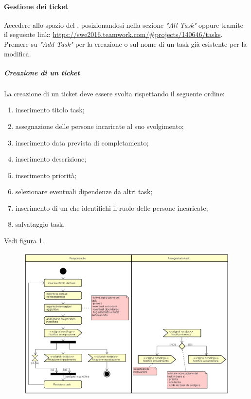             \paragraph{Gestione dei ticket}
            Accedere allo spazio  del , posizionandosi nella sezione \textit{"All Task"} oppure tramite il seguente link: \url{https://swe2016.teamwork.com/#projects/140646/tasks}. Premere su \textit{"Add Task"} per la creazione o sul nome di un task già esistente per la modifica.
            \subparagraph{Creazione di un ticket}\label{sec:creazioneticket}
                La creazione di un ticket deve essere svolta rispettando il seguente ordine:
                \begin{enumerate}
                	\item inserimento titolo task;
                	\item assegnazione delle persone incaricate al suo svolgimento;
                	\item inserimento data prevista di completamento;
                	\item inserimento descrizione;
                	\item inserimento priorità;
                	\item selezionare eventuali dipendenze da altri task;
                	\item inserimento di un  che identifichi il ruolo delle persone incaricate;
                	\item salvataggio task.
                \end{enumerate}
                Vedi figura \ref{fig:procassticket}.
    	        \begin{figure}[h!]
    		        \includegraphics[width=\textwidth]{img/proc_ass_ticket.png}
                    \label{fig:procassticket}
    	        \end{figure}\mbox{}\\

